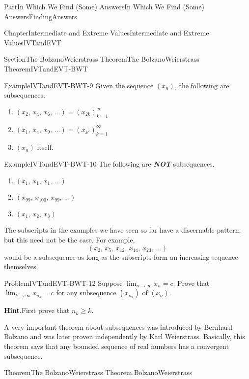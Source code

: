 \documentclass[oneside,10pt,]{book}
\newcommand{\blocktitlefont}{\relax}
\newcommand{\alert}[1]{\textbf{\textit{#1}}}
\numberwithin{equation}{part}
\def\limit#1#2#3{{\displaystyle\lim_{#1\rightarrow #2}#3}}
\begin{document}
\begin{partptx}{Part}{In Which We Find (Some) Answers}{}{In Which We Find (Some) Answers}{}{}{FindingAnswers}
\begin{chapterptx}{Chapter}{Intermediate and Extreme Values}{}{Intermediate and Extreme Values}{}{}{IVTandEVT}
\begin{sectionptx}{Section}{The Bolzano\textendash{}Weierstrass Theorem}{}{The Bolzano\textendash{}Weierstrass Theorem}{}{}{IVTandEVT-BWT}
\begin{example}{Example}{}{IVTandEVT-BWT-9}%
Given the sequence \(\left(x_n\right)\), the following are subsequences.%
\begin{enumerate}[font=\bfseries,label=(\alph*),ref=\alph*]%
\item{}\(\left(x_2,\,x_4,\,x_6,\,\ldots\right)=\left(x_{2k}\right)_{k=1}^\infty\)%
\item{}\(\left(x_1,\,x_4,\,x_9,\,\ldots\right)=\left(x_{k^2}\right)_{k=1}^ \infty\)%
\item{}\(\left(x_n\right)\) itself.%
\end{enumerate}%
\end{example}
\begin{example}{Example}{}{IVTandEVT-BWT-10}%
The following are \alert{NOT} subsequences.%
\begin{enumerate}[font=\bfseries,label=(\alph*),ref=\alph*]%
\item{}\(\left(x_1,\,x_1,\,x_1,\,\ldots\right)\)%
\item{}\(\left(x_{99},\,x_{100},\,x_{99},\,\ldots\right)\)%
\item{}\(\left(x_1,\,x_2,\,x_3\right)\)%
\end{enumerate}%
\end{example}
The subscripts in the examples we have seen so far have a discernable pattern, but this need not be the case. For example,%
\begin{equation*}
\left(x_2,\,x_5,\,x_{12},\,x_{14},\,x_{23},\,\ldots\right)
\end{equation*}
would be a subsequence as long as the subscripts form an increasing sequence themselves.%
\begin{problem}{Problem}{}{IVTandEVT-BWT-12}%
Suppose \(\limit{n}{\infty}{x_n}=c\).  Prove that \(\limit{k}{\infty}{x_{n_k}}=c\) for any subsequence \(\left(x_{n_k}\right)\) of \(\left(x_n\right)\).%
\par\smallskip%
\noindent\textbf{\blocktitlefont Hint}.\hypertarget{IVTandEVT-BWT-12-3}{}\quad{}First prove that \(n_k\geq k\).%
\end{problem}
 A very important theorem about subsequences was introduced by Bernhard Bolzano and was later proven independently by Karl Weierstrass. Basically, this theorem says that any bounded sequence of real numbers has a convergent subsequence.%
\begin{theorem}{Theorem}{The Bolzano\textendash{}Weierstrass Theorem.}{}{BolzanoWeierstrass}%
%

\end{theorem}
\end{sectionptx}
\end{chapterptx}
\end{partptx}
\end{document}
